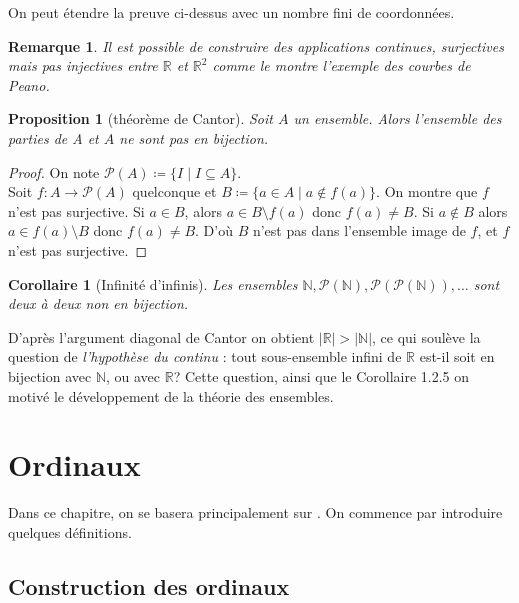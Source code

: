 \documentclass{article}
\theoremstyle{definition}
\theoremstyle{plain}
\newtheorem{proposition}[subsubsection]{Proposition}
\theoremstyle{plain}
\newtheorem{corollary}[subsubsection]{Corollaire}
\theoremstyle{plain}
\theoremstyle{plain}
\newtheorem{remark}[subsubsection]{Remarque}
\begin{document}
\par On peut étendre la preuve ci-dessus avec un nombre fini de coordonnées.
\begin{remark}
	Il est possible de construire des applications continues, surjectives mais pas injectives entre \( \mathbb{R} \) et \( \mathbb{R}^{2} \) comme le montre l'exemple des courbes de Peano. \cite{peano1890curve}
\end{remark}
\begin{proposition}[théorème de Cantor]
	Soit \( A \) un ensemble. Alors l'ensemble des parties de A et \( A \) ne sont pas en bijection.
\end{proposition} 
\begin{proof}
	On note \( \mathcal{P}(A) \coloneqq \{ I \mid I \subseteq A \}\). \\
	Soit \( f : A \rightarrow \mathcal{P}(A) \) quelconque et \( B \coloneqq \{ a \in A \mid a \not\in f(a)\} \). On montre que \( f \) n'est pas surjective. Si \( a \in B \), alors \( a \in B \setminus f(a) \) donc \( f(a) \neq B \). Si \( a \not\in B\) alors \( a \in f(a) \setminus B \) donc \( f(a) \neq B \). D'où \( B \) n'est pas dans l'ensemble image de \( f \), et \( f \) n'est pas surjective.
\end{proof}
\begin{corollary}[Infinité d'infinis]
	Les ensembles \( \mathbb{N}, \mathcal{P}(\mathbb{N}), \mathcal{P}(\mathcal{P}(\mathbb{N})), \ldots \) sont deux à deux non en bijection.
\end{corollary}

D'après l'argument diagonal de Cantor on obtient \( |\mathbb{R}| > |\mathbb{N}| \), ce qui soulève la question de \textit{l'hypothèse du continu} : tout sous-ensemble infini de \( \mathbb{R} \) est-il soit en bijection avec \( \mathbb{N} \), ou avec \( \mathbb{R} \)? Cette question, ainsi que le Corollaire 1.2.5 on motivé le développement de la théorie des ensembles.

\clearpage
\section{Ordinaux}

Dans ce chapitre, on se basera principalement sur \cite{dehornoy2017théorie}.
On commence par introduire quelques définitions.
\subsection{Construction des ordinaux} 
\end{document}
